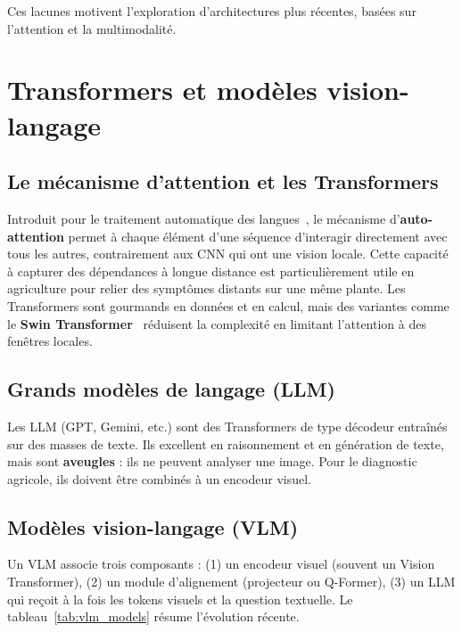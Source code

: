 Ces lacunes motivent l'exploration d'architectures plus récentes, basées sur l'attention et la multimodalité.
\section{Transformers et modèles vision-langage}
\label{sec:transformer_vlm}

\subsection{Le mécanisme d'attention et les Transformers}
Introduit pour le traitement automatique des langues~\cite{vaswani2017attention}, le mécanisme d'\textbf{auto-attention} permet à chaque élément d'une séquence d'interagir directement avec tous les autres, contrairement aux CNN qui ont une vision locale. Cette capacité à capturer des dépendances à longue distance est particulièrement utile en agriculture pour relier des symptômes distants sur une même plante. Les Transformers sont gourmands en données et en calcul, mais des variantes comme le \textbf{Swin Transformer}~\cite{liu2021swin} réduisent la complexité en limitant l'attention à des fenêtres locales.

\subsection{Grands modèles de langage (LLM)}
Les LLM (GPT, Gemini, etc.) sont des Transformers de type décodeur entraînés sur des masses de texte. Ils excellent en raisonnement et en génération de texte, mais sont \textbf{aveugles} : ils ne peuvent analyser une image. Pour le diagnostic agricole, ils doivent être combinés à un encodeur visuel.

\subsection{Modèles vision-langage (VLM)}
Un VLM associe trois composants : (1) un encodeur visuel (souvent un Vision Transformer), (2) un module d'alignement (projecteur ou Q-Former), (3) un LLM qui reçoit à la fois les tokens visuels et la question textuelle. Le tableau~\ref{tab:vlm_models} résume l'évolution récente.

